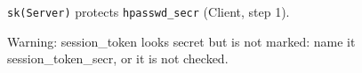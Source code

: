 \texttt{sk(Server)} protects \texttt{hpasswd\_secr} (Client, step 1).

Warning: session\_token looks secret but is not marked: name it session\_token\_secr, or it is not checked.
